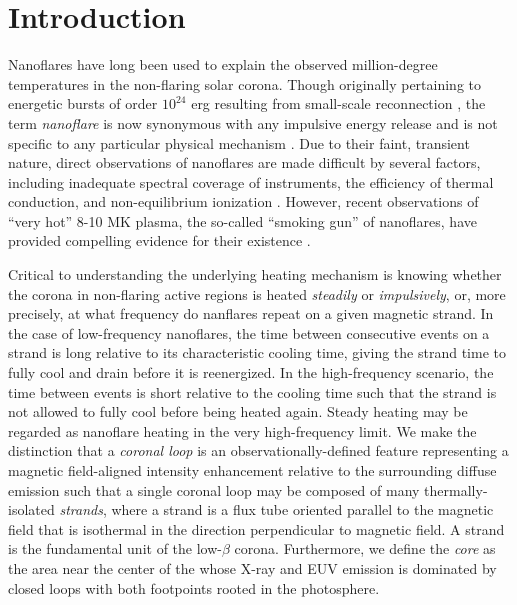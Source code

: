 \section{Introduction}\label{introduction}

Nanoflares have long been used to explain the observed million-degree temperatures in the non-flaring solar corona. Though originally pertaining to energetic bursts of order $10^{24}$ erg resulting from small-scale reconnection \citep{parker_nanoflares_1988}, the term \textit{nanoflare} is now synonymous with any impulsive energy release and is not specific to any particular physical mechanism \citep{klimchuk_key_2015}. Due to their faint, transient nature, direct observations of nanoflares are made difficult by several factors, including inadequate spectral coverage of instruments, the efficiency of thermal conduction, and non-equilibrium ionization \citep{cargill_implications_1994,winebarger_defining_2012,barnes_inference_2016}. However, recent observations of ``very hot'' 8-10 MK plasma, the so-called ``smoking gun'' of nanoflares, have provided compelling evidence for their existence \citep[e.g.][]{brosius_pervasive_2014,caspi_new_2015,parenti_spectroscopy_2017,ishikawa_detection_2017}.

Critical to understanding the underlying heating mechanism is knowing whether the corona in non-flaring active regions is heated \textit{steadily} or \textit{impulsively}, or, more precisely, at what frequency do nanflares repeat on a given magnetic strand. In the case of low-frequency nanoflares, the time between consecutive events on a strand is long relative to its characteristic cooling time, giving the strand time to fully cool and drain before it is reenergized. In the high-frequency scenario, the time between events is short relative to the cooling time such that the strand is not allowed to fully cool before being heated again. Steady heating may be regarded as nanoflare heating in the very high-frequency limit. We make the distinction that a \textit{coronal loop} is an observationally-defined feature representing a magnetic field-aligned intensity enhancement relative to the surrounding diffuse emission such that a single coronal loop may be composed of many thermally-isolated \textit{strands}, where a strand is a flux tube oriented parallel to the magnetic field that is isothermal in the direction perpendicular to magnetic field. A strand is the fundamental unit of the low-$\beta$ corona. Furthermore, we define the \AR{} \textit{core} as the area near the center of the \AR{} whose X-ray and EUV emission is dominated by closed loops with both footpoints rooted in the photosphere.

